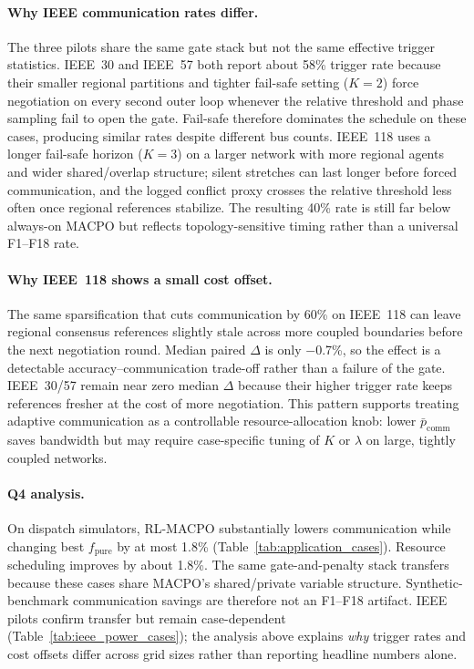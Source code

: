 \documentclass[conference]{IEEEtran}
\begin{document}
\paragraph{Why IEEE communication rates differ.}
The three pilots share the same gate stack but not the same effective trigger statistics. IEEE~30 and IEEE~57 both report about 58\% trigger rate because their smaller regional partitions and tighter fail-safe setting ($K{=}2$) force negotiation on every second outer loop whenever the relative threshold and phase sampling fail to open the gate. Fail-safe therefore dominates the schedule on these cases, producing similar rates despite different bus counts. IEEE~118 uses a longer fail-safe horizon ($K{=}3$) on a larger network with more regional agents and wider shared/overlap structure; silent stretches can last longer before forced communication, and the logged conflict proxy crosses the relative threshold less often once regional references stabilize. The resulting 40\% rate is still far below always-on MACPO but reflects topology-sensitive timing rather than a universal F1--F18 rate.

\paragraph{Why IEEE~118 shows a small cost offset.}
The same sparsification that cuts communication by 60\% on IEEE~118 can leave regional consensus references slightly stale across more coupled boundaries before the next negotiation round. Median paired $\Delta$ is only $-$0.7\%, so the effect is a detectable accuracy--communication trade-off rather than a failure of the gate. IEEE~30/57 remain near zero median $\Delta$ because their higher trigger rate keeps references fresher at the cost of more negotiation. This pattern supports treating adaptive communication as a controllable resource-allocation knob: lower $\bar p_{\mathrm{comm}}$ saves bandwidth but may require case-specific tuning of $K$ or $\lambda$ on large, tightly coupled networks.

\paragraph{Q4 analysis.} On dispatch simulators, RL-MACPO substantially lowers communication while changing best $f_{\mathrm{pure}}$ by at most 1.8\% (Table~\ref{tab:application_cases}). Resource scheduling improves by about 1.8\%. The same gate-and-penalty stack transfers because these cases share MACPO's shared/private variable structure. Synthetic-benchmark communication savings are therefore not an F1--F18 artifact. IEEE pilots confirm transfer but remain case-dependent (Table~\ref{tab:ieee_power_cases}); the analysis above explains \emph{why} trigger rates and cost offsets differ across grid sizes rather than reporting headline numbers alone.
\end{document}
